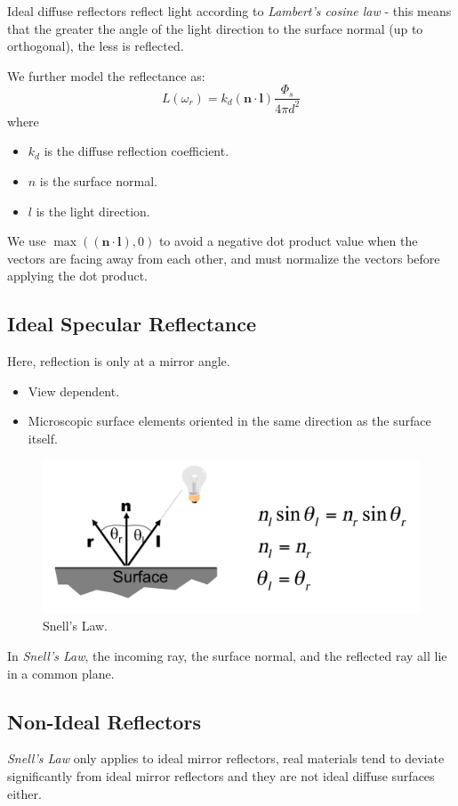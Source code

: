 \documentclass[11pt]{article}
\begin{document}
Ideal diffuse reflectors reflect light according to \textit{Lambert's cosine law} - this means that the greater the angle of the light direction to the surface normal (up to orthogonal), the less is reflected. 

We further model the reflectance as:
\[
  L(\omega_r) = k_d (\textbf{n} \cdot \textbf{l}) \frac{\Phi_s}{4\pi d^2} 
\]
where
\begin{itemize}
  \item $k_d$ is the diffuse reflection coefficient.
  \item $n$ is the surface normal.
  \item $l$ is the light direction.
\end{itemize}

We use $\max ((\textbf{n} \cdot \textbf{l}), 0)$ to avoid a negative dot product value when the vectors are facing away from each other, and must normalize the vectors before applying the dot product.

\subsection{Ideal Specular Reflectance}
Here, reflection is only at a mirror angle.
\begin{itemize}
  \item View dependent.
  \item Microscopic surface elements oriented in the same direction as the surface itself.
\end{itemize}

\begin{figure}[htb!]
  \centering
  \caption{Snell's Law.}
  \includegraphics[scale=0.3]{snell}
\end{figure}

In \textit{Snell's Law}, the incoming ray, the surface normal, and the reflected ray all lie in a common plane.

\subsection{Non-Ideal Reflectors}
\textit{Snell's Law} only applies to ideal mirror reflectors, real materials tend to deviate significantly from ideal mirror reflectors and they are not ideal diffuse surfaces either.
\end{document}
